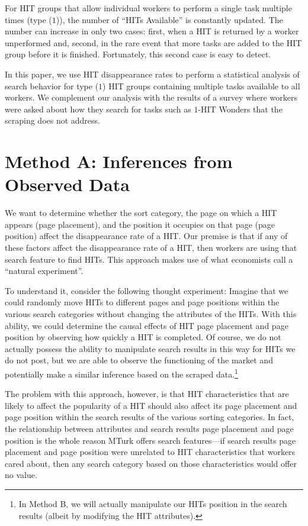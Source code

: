 \documentclass{sig-alternate}
\begin{document}
For HIT groups that allow individual workers to perform a single task multiple times (type ($1$)), the number of ``HITs Available'' is constantly updated.  The number can increase in only two cases: first, when a HIT is returned by a worker unperformed and, second, in the rare event that more tasks are added to the HIT group before it is finished.  Fortunately, this second case is easy to detect.

In this paper, we use HIT disappearance rates to perform a
statistical analysis of search behavior for type ($1$) HIT groups containing multiple tasks available to all workers.  We complement our analysis with the results of a survey where workers were asked about how they search for tasks such as $1$-HIT Wonders that the scraping does not address.

\section{Method A: Inferences from Observed Data}
We want to determine whether the sort category, the page on which a
HIT appears (page placement), and the position it occupies on that
page (page position) affect the disappearance rate of a HIT.  Our
premise is that if any of these factors affect the disappearance rate
of a HIT, then workers are using that search feature to find HITs.
This approach makes use of what economists call a ``natural
experiment''.  

To understand it, consider the following thought experiment:
Imagine that we could randomly move HITs to different pages and page
positions within the various search categories without changing the
attributes of the HITs.  With this ability, we could determine the
causal effects of HIT page placement and page position by observing
how quickly a HIT is completed. Of course, we do not actually possess
the ability to manipulate search results in this way for HITs we do
not post, but we are able to observe the functioning of the market and
potentially make a similar inference based on the scraped
data.\footnote{In Method B, we will actually manipulate our HITs
  position in the search results (albeit by modifying the HIT
  attributes).}

The problem with this approach, however, is that HIT characteristics
that are likely to affect the popularity of a HIT should also affect
its page placement and page position within the search results of the
various sorting categories.  In fact, the relationship between
attributes and search results page placement and page position is the
whole reason MTurk offers search features---if search results page
placement and page position were unrelated to HIT characteristics that
workers cared about, then any search category based on those
characteristics would offer no value.
\end{document}
